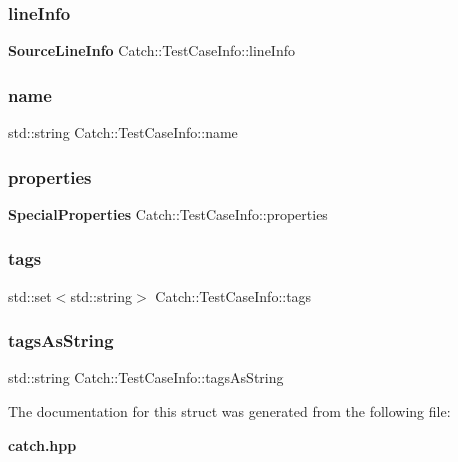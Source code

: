 \mbox{\label{struct_catch_1_1_test_case_info_aa9407b7f442655b51a2aad24b3fa2fd3}} 
\subsubsection{line\+Info}
{\footnotesize\ttfamily \textbf{ Source\+Line\+Info} Catch\+::\+Test\+Case\+Info\+::line\+Info}

\mbox{\label{struct_catch_1_1_test_case_info_a463794e2f5cfead307c93efd134ade36}} 
\subsubsection{name}
{\footnotesize\ttfamily std\+::string Catch\+::\+Test\+Case\+Info\+::name}

\mbox{\label{struct_catch_1_1_test_case_info_afc1e84bd7a2e180895a06d9131302af0}} 
\subsubsection{properties}
{\footnotesize\ttfamily \textbf{ Special\+Properties} Catch\+::\+Test\+Case\+Info\+::properties}

\mbox{\label{struct_catch_1_1_test_case_info_a045f62e7719a8760a5b456f7fd2dc97c}} 
\subsubsection{tags}
{\footnotesize\ttfamily std\+::set$<$std\+::string$>$ Catch\+::\+Test\+Case\+Info\+::tags}

\mbox{\label{struct_catch_1_1_test_case_info_ac65c2d36fd36f71e9bf782b2ea245c64}} 
\subsubsection{tags\+As\+String}
{\footnotesize\ttfamily std\+::string Catch\+::\+Test\+Case\+Info\+::tags\+As\+String}



The documentation for this struct was generated from the following file\+:\begin{DoxyCompactItemize}
\item 
\textbf{ catch.\+hpp}\end{DoxyCompactItemize}
